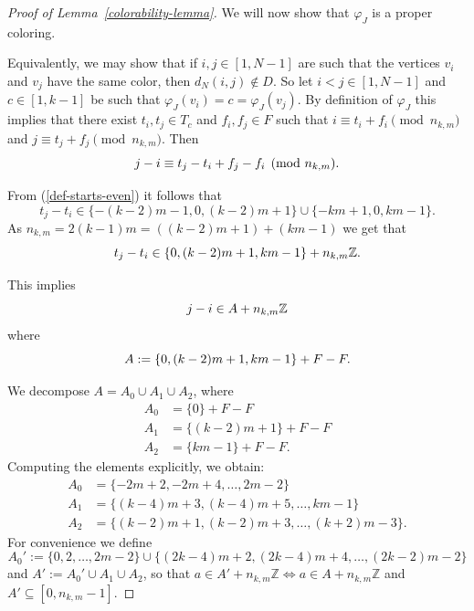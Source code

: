 \documentclass[a4paper,10pt,hidelinks]{amsart}
\theoremstyle{definition}
\begin{document}
\begin{proof}[Proof of Lemma~\ref{colorability-lemma}]
    We will now show that $\varphi_J$ is a proper coloring. 

    Equivalently, we may show that if $i, j \in [1, N-1]$ are such that the vertices $v_i$ and $v_j$ have the same color, then $d_N(i, j) \notin D$. So let $i < j \in [1, N-1]$ and $c \in [1, k-1]$ be such that $\varphi_J(v_i) = c = \varphi_J(v_j)$. By definition of $\varphi_J$ this implies that there exist $t_i, t_j \in T_c$ and $f_i, f_j \in F$ such that $i \equiv t_i + f_i \pmod{n_{k,m}}$ and $j \equiv t_j + f_j \pmod{n_{k,m}}$. Then 
    \begin{equation}\notag
    j - i \equiv t_j - t_i + f_j - f_i \pmod{n_{k,m}}.
    \end{equation}

    From (\ref{def-starts-even}) it follows that
    \begin{equation}\label{all-start-diffs}
        t_j - t_i \in \{-(k-2)m - 1, 0, (k-2)m + 1\} \cup \{-km + 1, 0, km - 1\}. 
    \end{equation}
    As $n_{k,m} = 2(k - 1)m = ((k - 2)m + 1) + (km - 1)$ we get that
    \begin{equation}\label{start-diffs}\notag
        t_j - t_i \in \{0, (k-2)m + 1, km - 1\} + n_{k,m}\mathbb{Z}. 
    \end{equation}
    

    This implies
    \begin{equation}\notag
        j - i \in A + n_{k,m}\mathbb{Z}
    \end{equation}
    where
    \begin{equation}\notag
     A := \{0, (k-2)m + 1, km - 1\} + F - F.
    \end{equation}

    We decompose $A = A_0 \cup A_1 \cup A_2$, where
    \begin{align*}
        A_0 &= \{0\} + F - F \\
        A_1 &= \{(k - 2)m + 1\} + F - F \\
        A_2 &= \{km - 1\} + F - F .
    \end{align*}
    Computing the elements explicitly, we obtain:
    \begin{align*}
        A_0 &= \{-2m + 2, -2m + 4, \dots, 2m -2\} \\
        A_1 &= \{(k-4)m + 3, (k-4)m + 5, \dots, km - 1\} \\
        A_2 &= \{(k-2)m + 1, (k-2)m + 3, \dots, (k+2)m - 3\}.
    \end{align*}
    For convenience we define
    \begin{equation*}
        A_0' := \{0, 2, \dots, 2m -2\} \cup \{(2k-4)m + 2, (2k-4)m + 4, \dots, (2k-2)m -2\}
    \end{equation*}
    and $A' := A_0' \cup A_1 \cup A_2$, so that $a \in A' + n_{k,m}\mathbb{Z} \iff a \in A + n_{k,m} \mathbb Z$ and $A' \subseteq [0, n_{k, m} - 1]$.



\end{proof}
\end{document}

